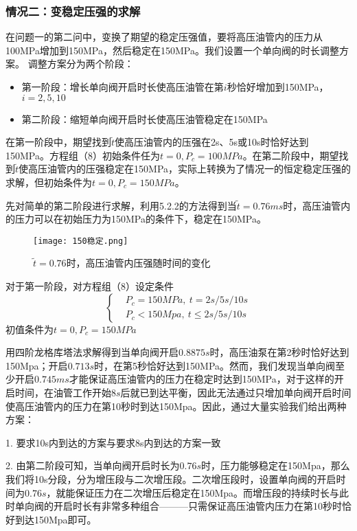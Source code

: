 \documentclass[withoutpreface,bwprint]{cumcmthesis} %
\begin{document}
			\subsubsection{情况二：变稳定压强的求解}
			在问题一的第二问中，变换了期望的稳定压强值，要将高压油管内的压力从100MPa增加到150MPa，然后稳定在150MPa。我们设置一个单向阀的时长调整方案。
			调整方案分为两个阶段：
			\begin{itemize}
				\item 第一阶段：增长单向阀开启时长使高压油管在第$i$秒恰好增加到150MPa，$i = 2,5,10$
				\item 第二阶段：缩短单向阀开启时长使高压油管稳定在150MPa
			\end{itemize}
			在第一阶段中，期望找到$\widetilde{t}$使高压油管内的压强在2s、5s或10s时恰好达到150MPa。方程组（8）初始条件任为$t = 0, P_c = 100MPa$。在第二阶段中，期望找到$\widetilde{t}$使高压油管内的压强稳定在150MPa，实际上转换为了情况一的恒定稳定压强的求解，但初始条件为$t = 0, P_c = 150MPa$。
			
			先对简单的第二阶段进行求解，利用5.2.2的方法得到当$\widetilde{t} = 0.76ms$时，高压油管内的压力可以在初始压力为150MPa的条件下，稳定在150MPa。
			\begin{figure}[!htbp]
				\centering
				\texttt{[image: 150稳定.png]}
				\caption{$\widetilde{t}=0.76$时，高压油管内压强随时间的变化}
			\end{figure}
			对于第一阶段，对方程组（8）设定条件
			\begin{equation} \left\{
			\begin{aligned}
			&P_c = 150MPa,\ t = 2s/5s/10s \\
			&P_c < 150Mpa,\ t \leq 2s/5s/10s
			\end{aligned}
			\right. \end{equation}
			初值条件为$t = 0, P_c = 150MPa$
			
			用四阶龙格库塔法求解得到当单向阀开启$0.8875s$时，高压油泵在第2秒时恰好达到150Mpa；开启$0.713s$时，在第5秒恰好达到150MPa。然而，我们发现当单向阀至少开启$0.745ms$才能保证高压油管内的压力在稳定时达到150MPa，对于这样的开启时间，在油管工作开始$8s$后就已到达平衡，因此无法通过只增加单向阀开启时间使高压油管内的压力在第10秒时到达150Mpa。因此，通过大量实验我们给出两种方案：
			
			1. 要求10s内到达的方案与要求8s内到达的方案一致
			
			2. 由第二阶段可知，当单向阀开启时长为$0.76s$时，压力能够稳定在150Mpa，那么我们将10s分段，分为增压段与二次增压段。二次增压段时，设置单向阀的开启时间为$0.76s$，就能保证压力在二次增压后稳定在150Mpa。而增压段的持续时长与此时单向阀的开启时长有非常多种组合———只需保证高压油管内压力在第10秒时恰好到达150Mpa即可。
			
\end{document}
